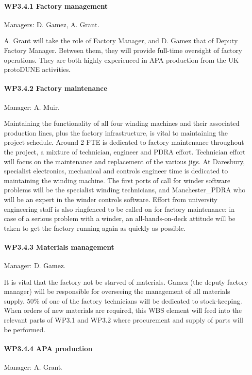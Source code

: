 \paragraph{WP3.4.1 Factory management} Managers: D. Gamez, A. Grant.

A. Grant will take the role of Factory Manager, and D. Gamez that of Deputy Factory Manager. Between them, they will provide full-time oversight of factory operations. They are both highly experienced in APA production from the UK protoDUNE activities.

\paragraph{WP3.4.2 Factory maintenance} Manager: A. Muir.

Maintaining the functionality of all four winding machines and their associated production lines, plus the factory infrastructure, is vital to maintaining the project schedule. Around 2 FTE is dedicated to factory maintenance throughout the project, a mixture of technician, engineer and PDRA effort. Technician effort will focus on the maintenance and replacement of the various jigs. At Daresbury, specialist electronics, mechanical and controls engineer time is dedicated to maintaining the winding machine. The first ports of call for winder software problems will be the specialist winding technicians, and Manchester\_PDRA who will be an expert in the winder controls software. Effort from university engineering staff is also ringfenced to be called on for factory maintenance: in case of a serious problem with a winder, an all-hands-on-deck attitude will be taken to get the factory running again as quickly as possible.

\paragraph{WP3.4.3 Materials management} Manager: D. Gamez.

It is vital that the factory not be starved of materials. Gamez (the deputy factory manager) will be responsible for overseeing the management of all materials supply. 50\% of one of the factory technicians will be dedicated to stock-keeping. When orders of new materials are required, this WBS element will feed into the relevant parts of WP3.1 and WP3.2 where procurement and supply of parts will be performed. 

\paragraph{WP3.4.4 APA production} Manager: A. Grant.

